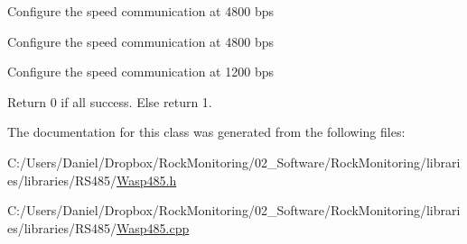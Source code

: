 Configure the speed communication at 4800 bps

Configure the speed communication at 4800 bps

Configure the speed communication at 1200 bps

Return 0 if all success. Else return 1. 

The documentation for this class was generated from the following files\+:\begin{DoxyCompactItemize}
\item 
C\+:/\+Users/\+Daniel/\+Dropbox/\+Rock\+Monitoring/02\+\_\+\+Software/\+Rock\+Monitoring/libraries/libraries/\+R\+S485/\hyperlink{_wasp485_8h}{Wasp485.\+h}\item 
C\+:/\+Users/\+Daniel/\+Dropbox/\+Rock\+Monitoring/02\+\_\+\+Software/\+Rock\+Monitoring/libraries/libraries/\+R\+S485/\hyperlink{_wasp485_8cpp}{Wasp485.\+cpp}\end{DoxyCompactItemize}

